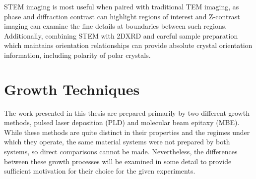 STEM imaging is most useful when paired with traditional TEM imaging, as phase and diffraction contrast can highlight regions of interest and Z-contrast imaging can examine the fine details at boundaries between such regions. Additionally, combining STEM with 2DXRD and careful sample preparation which maintains orientation relationships can provide absolute crystal orientation information, including polarity of polar crystals.

\section{Growth Techniques}
The work presented in this thesis are prepared primarily by two different growth methods, pulsed laser deposition (PLD) and molecular beam epitaxy (MBE). While these methods are quite distinct in their properties and the regimes under which they operate, the same material systems were not prepared by both systems, so direct comparisons cannot be made. Nevertheless, the differences between these growth processes will be examined in some detail to provide sufficient motivation for their choice for the given experiments.
